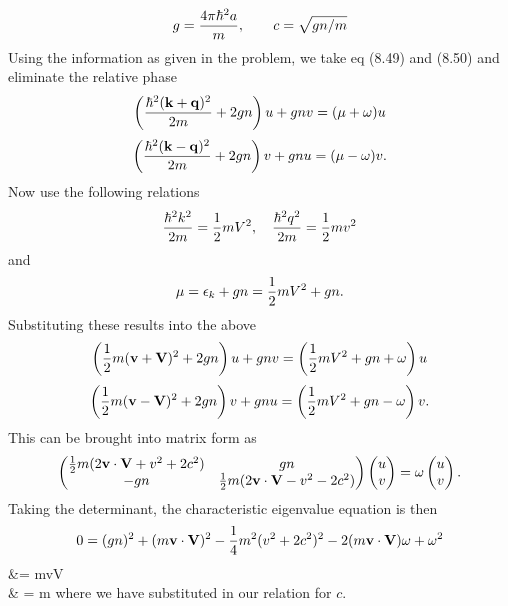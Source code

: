 \documentclass[10pt,letterpaper]{article}
\begin{document}
\benum
\item
\[
	g = \frac{4\pi \hbar^2 a}{m},\qquad c = \sqrt{gn/m}
\]
Using the information as given in the problem, we take eq (8.49) and (8.50) and eliminate the relative phase
\[
	\left( \frac{\hbar^2(\mathbf{k}+\mathbf{q})^2}{2m}+2gn\right)u+gnv= (\mu +\omega)u
\]
\[
	\left( \frac{\hbar^2(\mathbf{k}-\mathbf{q})^2}{2m}+2gn\right)v+gnu= (\mu -\omega)v.
\]
Now use the following relations
\[
	\frac{\hbar^2k^2}{2m} = \frac{1}{2}mV^2,\quad \frac{\hbar^2 q^2}{2m} = \frac{1}{2}mv^2
\]
and 
\[
	\mu = \epsilon_k+gn = \frac{1}{2}mV^2+gn.
\]
Substituting these results into the above
\[
	\left(\frac{1}{2}m(\mathbf{v}+\mathbf{V})^2+2gn\right)u +gnv = \left(\frac{1}{2}mV^2+gn+\omega\right)u
\]
\[
	\left(\frac{1}{2}m(\mathbf{v}-\mathbf{V})^2+2gn\right)v +gnu = \left(\frac{1}{2}mV^2+gn-\omega\right)v.
\]
This can be brought into matrix form as
\[
	\begin{pmatrix} \frac{1}{2}m(2\mathbf{v}\cdot \mathbf{V}+v^2+2c^2) & gn \\ -gn & \frac{1}{2}m
	(2\mathbf{v}\cdot \mathbf{V}-v^2-2c^2) \end{pmatrix}
	\begin{pmatrix} u \\v \end{pmatrix} = \omega \begin{pmatrix} u\\v \end{pmatrix}.
\]
Taking the determinant, the characteristic eigenvalue equation is then
\[
	0 = (gn)^2 +(m\mathbf{v}\cdot \mathbf{V})^2 -\frac{1}{4}m^2(v^2+2c^2)^2-2(m\mathbf{v}\cdot\mathbf{V})\omega +\omega^2
\]
\ba
	\Rightarrow \omega &= m\vect v\cdot \vect V \pm {}\\
	& = m
\ea
where we have substituted in our relation for $c$. 	
	
\end{document}
